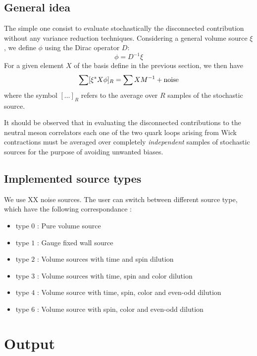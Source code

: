 \documentclass[a4paper]{article}
\newcommand{\be}{\begin{equation}}
\newcommand{\ee}{\end{equation}}
\begin{document}
\subsection{General idea}

The simple one consist to evaluate stochastically the disconnected contribution without any variance reduction techniques. 
Considering a general volume source $\xi$, we define $\phi$ using the Dirac operator $D$:
\be
\phi = D^{-1} \xi
\ee
For a given element $X$ of the basis define in the previous section, we then have
 \begin{equation}
 \sum [\xi^* X \phi ]_R =
 \sum X M^{-1} + {\rm noise}
 \label{eq:B1}
 \end{equation}
 where the symbol $[\dots]_R$ refers to the average over $R$  samples of the stochastic source.

It should be observed that in evaluating the disconnected
contributions to the neutral  meson correlators each one of the two
quark loops arising from Wick contractions 
 must be averaged over completely {\em independent} samples of
stochastic sources for the purpose of avoiding unwanted biases. 



\subsection{Implemented source types}

We use XX noise sources. 
The user can switch between different source type, which have the
following correspondance :

\begin{itemize}
\item{ type $0$ : Pure volume source}
\item{ type $1$ : Gauge fixed wall source }
\item{ type $2$ : Volume sources with  time and spin dilution}
\item{ type $3$ : Volume sources with  time, spin and  color dilution}
\item{ type $4$ : Volume source with  time, spin, color and even-odd
    dilution} 
\item{type $6$ : Volume source with spin, color and even-odd dilution}
\end{itemize}


\section{Output}
\end{document}
